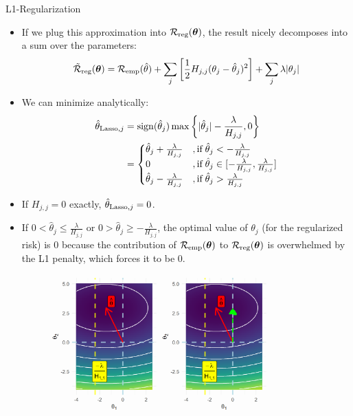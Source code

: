 \begin{vbframe} {L1-Regularization}
  \begin{itemize}
    \item If we plug this approximation into $\mathcal{R}_{\text{reg}}(\bm{\theta})$, the result nicely decomposes into a sum over the parameters:
  $$\mathcal{\tilde R}_{\text{reg}}(\bm{\theta}) = \mathcal{R}_{\text{emp}}(\hat{\theta}) + \sum_j \left[ \frac{1}{2} H_{j,j} (\theta_j - \hat{\theta}_j)^2 \right] + \sum_j \lambda |\theta_j|$$
    \item We can minimize analytically:
     \begin{align*}\hat{\theta}_{\text{Lasso},j} &= \operatorname{sign}(\hat{\theta}_j) \max \left\{ |\hat{\theta}_j| - \frac{\lambda}{H_{j,j}},0 \right\} \\
     &= \begin{cases} 
     \hat{\theta}_j + \frac{\lambda}{H_{j,j}} &, \text{if}   \;\hat{\theta}_j < -\frac{\lambda}{H_{j,j}} \\
       0 &, \text{if}   \;\hat{\theta}_j \in [-\frac{\lambda}{H_{j,j}}, \frac{\lambda}{H_{j,j}}] \\
     \hat{\theta}_j - \frac{\lambda}{H_{j,j}} &, \text{if}   \;\hat{\theta}_j > \frac{\lambda}{H_{j,j}} \\
     \end{cases}
     \end{align*}
  \item If $H_{j,j} = 0$ exactly, $\hat{\theta}_{\text{Lasso},j} = 0$.

\framebreak

\item If  $0 < \hat{\theta}_j \leq \frac{\lambda}{H_{j,j}}$ or $0 > \hat{\theta}_j \geq -\frac{\lambda}{H_{j,j}}$, the optimal value of $\theta_j$ (for the regularized risk) is $0$ because the contribution of  $\mathcal{R}_{\text{emp}}(\bm{\theta})$ to $\mathcal{R}_{\text{reg}}(\bm{\theta})$ is overwhelmed by the L1 penalty, which forces it to be $0$.

\begin{figure}
\includegraphics[width=0.8\textwidth]{figure/l1_reg_hess_01.png}\\
\end{figure}


\end{itemize}
\end{vbframe}
